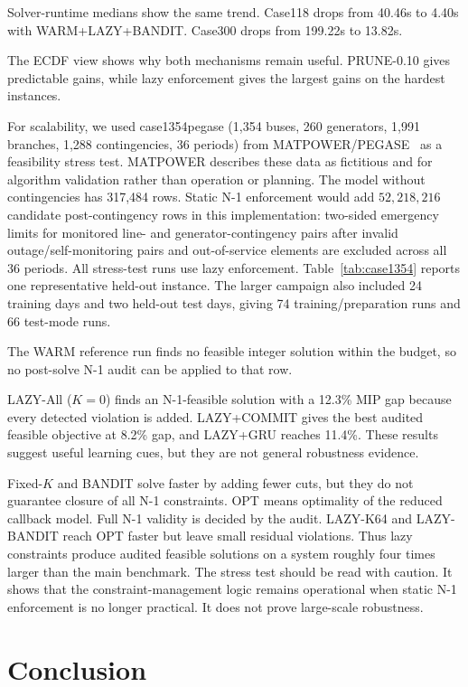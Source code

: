 \documentclass[runningheads]{llncs}
\begin{document}
Solver-runtime medians show the same trend. Case118 drops from 40.46s to 4.40s with WARM+LAZY+BANDIT. Case300 drops from 199.22s to 13.82s.

The ECDF view shows why both mechanisms remain useful. PRUNE-0.10 gives predictable gains, while lazy enforcement gives the largest gains on the hardest instances.

For scalability, we used case1354pegase (1{,}354 buses, 260 generators, 1{,}991 branches, 1{,}288 contingencies, 36 periods) from MATPOWER/PEGASE~\cite{MATPOWER,PEGASE} as a feasibility stress test. MATPOWER describes these data as fictitious and for algorithm validation rather than operation or planning. The model without contingencies has 317{,}484 rows. Static N-1 enforcement would add $52{,}218{,}216$ candidate post-contingency rows in this implementation: two-sided emergency limits for monitored line- and generator-contingency pairs after invalid outage/self-monitoring pairs and out-of-service elements are excluded across all 36 periods. All stress-test runs use lazy enforcement. Table~\ref{tab:case1354} reports one representative held-out instance. The larger campaign also included 24 training days and two held-out test days, giving 74 training/preparation runs and 66 test-mode runs.



The WARM reference run finds no feasible integer solution within the budget, so no post-solve N-1 audit can be applied to that row.

LAZY-All ($K{=}0$) finds an N-1-feasible solution with a 12.3\% MIP gap because every detected violation is added. LAZY+COMMIT gives the best audited feasible objective at 8.2\% gap, and LAZY+GRU reaches 11.4\%. These results suggest useful learning cues, but they are not general robustness evidence.

Fixed-$K$ and BANDIT solve faster by adding fewer cuts, but they do not guarantee closure of all N-1 constraints. OPT means optimality of the reduced callback model. Full N-1 validity is decided by the audit. LAZY-K64 and LAZY-BANDIT reach OPT faster but leave small residual violations. Thus lazy constraints produce audited feasible solutions on a system roughly four times larger than the main benchmark. The stress test should be read with caution. It shows that the constraint-management logic remains operational when static N-1 enforcement is no longer practical. It does not prove large-scale robustness.

\section{Conclusion}
\end{document}
